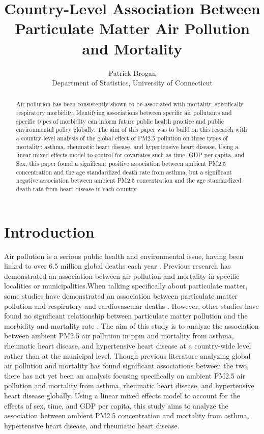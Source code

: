 \documentclass[12pt, letterpaper, twoside]{article}\usepackage[]{graphicx}\usepackage[]{xcolor}
\title{Country-Level Association Between Particulate Matter Air Pollution and Mortality}
\author{Patrick Brogan\\[1ex]
  Department of Statistics, University of Connecticut\\}
\begin{document}
\maketitle

\begin{abstract}
Air pollution has been consistently shown to be associated with mortality,
specifically respiratory morbidity. Identifying associations between specific
air pollutants and specific types of morbidity can inform future public health
practice and public environmental policy globally. The aim of this paper was to
build on this research with a country-level analysis of the global effect of
PM2.5 pollution on three types of mortality: asthma, rheumatic heart disease,
and hypertensive heart disease. Using a linear mixed effects model to control
for covariates such as time, GDP per capita, and Sex, this paper found a
significant positive association between ambient PM2.5 concentration and the age
standardized death rate from asthma, but a significant negative association
between ambient PM2.5 concentration and the age standardized death rate from
heart disease in each country.
\end{abstract}

\section*{Introduction}
Air pollution is a serious public health and environmental issue, having been
linked to over 6.5 million global deaths each year \citep{fuller2022pollution}.
Previous research has demonstrated an association between air pollution and
mortality in specific localities or municipalities\citep{dockery1993association,
sunyer1996air, jerrett2005spatial, analitis2006short}.When talking specifically
about particulate matter, some studies have demonstrated an association between
particulate matter pollution and respiratory and cardiovascular deaths
\citep{analitis2006short}. However, other studies have found no significant
relationship between particulate matter pollution and the morbidity and
mortality rate \citep{khojasteh2021long}. The aim of this study is to analyze
the association between ambient PM2.5 air pollution in ppm and mortality from
asthma, rheumatic heart disease, and hypertensive heart disease at a country-wide
level rather than at the municipal level. Though previous literature analyzing
global air pollution and mortality has found significant associations between
the two, there has not yet been an analysis focusing specifically on ambient
PM2.5 air pollution and mortality from asthma, rheumatic heart disease, and
hypertensive heart disease globally. Using a linear mixed effects model to
account for the effects of sex, time, and GDP per capita, this study aims to
analyze the association between ambient PM2.5 concentration and mortality from
asthma, hypertensive heart disease, and rheumatic heart disease.
\end{document}
